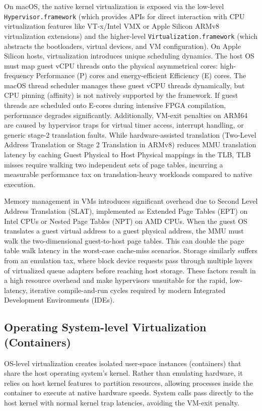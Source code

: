 On macOS, the native kernel virtualization is exposed via the low-level \texttt{Hypervisor.framework} (which provides APIs for direct interaction with CPU virtualization features like VT-x/Intel VMX or Apple Silicon ARMv8 virtualization extensions) and the higher-level \texttt{Virtualization.framework} (which abstracts the bootloaders, virtual devices, and VM configuration). On Apple Silicon hosts, virtualization introduces unique scheduling dynamics. The host OS must map guest vCPU threads onto the physical asymmetrical cores: high-frequency Performance (P) cores and energy-efficient Efficiency (E) cores. The macOS thread scheduler manages these guest vCPU threads dynamically, but CPU pinning (affinity) is not natively supported by the framework. If guest threads are scheduled onto E-cores during intensive FPGA compilation, performance degrades significantly. Additionally, VM-exit penalties on ARM64 are caused by hypervisor traps for virtual timer access, interrupt handling, or generic stage-2 translation faults. While hardware-assisted translation (Two-Level Address Translation or Stage 2 Translation in ARMv8) reduces MMU translation latency by caching Guest Physical to Host Physical mappings in the TLB, TLB misses require walking two independent sets of page tables, incurring a measurable performance tax on translation-heavy workloads compared to native execution.

Memory management in VMs introduces significant overhead due to Second Level Address Translation (SLAT), implemented as Extended Page Tables (EPT) on Intel CPUs or Nested Page Tables (NPT) on AMD CPUs. When the guest OS translates a guest virtual address to a guest physical address, the MMU must walk the two-dimensional guest-to-host page tables. This can double the page table walk latency in the worst-case cache-miss scenarios. Storage  similarly suffers from an emulation tax, where block device requests pass through multiple layers of virtualized queue adapters before reaching host storage. These factors result in a high resource overhead and make hypervisors unsuitable for the rapid, low-latency, iterative compile-and-run cycles required by modern Integrated Development Environments (IDEs).

\subsection{Operating System-level Virtualization (Containers)}
OS-level virtualization creates isolated user-space instances (containers) that share the host operating system's kernel. Rather than emulating hardware, it relies on host kernel features to partition resources, allowing processes inside the container to execute at native hardware speeds. System calls pass directly to the host kernel with normal kernel trap latencies, avoiding the VM-exit penalty. 


